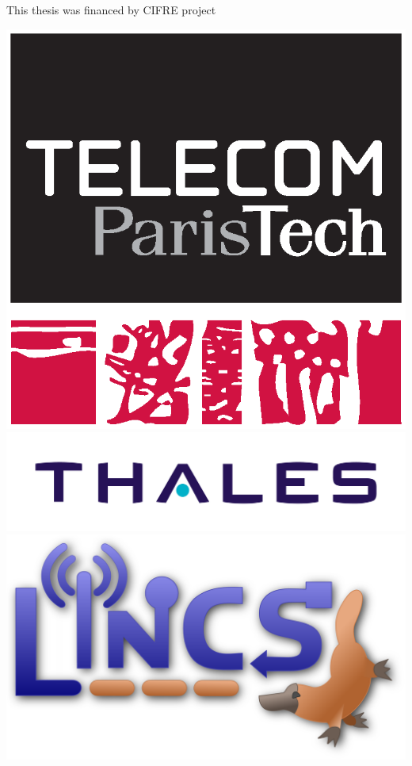 
\thispagestyle{empty}

This thesis was financed by CIFRE project

\includegraphics[scale=0.2]{img/logos/telecom.eps}
\includegraphics[scale=0.2]{img/logos/thales.jpg}
\includegraphics[scale=0.12]{img/logos/lincs_pupuce.png}

